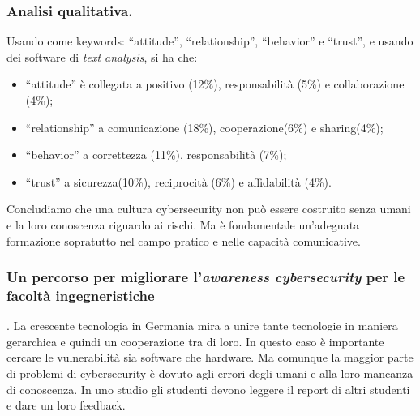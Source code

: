 \documentclass[a4page, 11pt, twocolumn]{article}
\begin{document}
\subsubsection{Analisi qualitativa.}
Usando come keywords: ``attitude'', ``relationship'', ``behavior'' e ``trust'', e usando dei software di \textit{text analysis}, si ha che:
\begin{itemize}
  \item ``attitude'' è collegata a positivo (12\%), responsabilità (5\%) e collaborazione (4\%);
  \item ``relationship'' a comunicazione (18\%), cooperazione(6\%) e sharing(4\%);
  \item ``behavior'' a correttezza (11\%), responsabilità (7\%);
  \item ``trust'' a sicurezza(10\%), reciprocità (6\%) e affidabilità (4\%).
\end{itemize}
Concludiamo che una cultura cybersecurity non può essere costruito senza umani e la loro conoscenza riguardo ai rischi.
Ma è fondamentale un'adeguata formazione sopratutto nel campo pratico e nelle capacità comunicative.

\subsubsection{Un percorso per migliorare l'\textit{awareness cybersecurity} per le facoltà ingegneristiche}.
La crescente tecnologia in Germania mira a unire tante tecnologie in maniera gerarchica e quindi un cooperazione tra di loro.
In questo caso è importante cercare le vulnerabilità sia software che hardware.
Ma comunque la maggior parte di problemi di cybersecurity è dovuto agli errori degli umani e alla loro mancanza di conoscenza.
In uno studio gli studenti devono leggere il report di altri studenti e dare un loro feedback.
\end{document}
